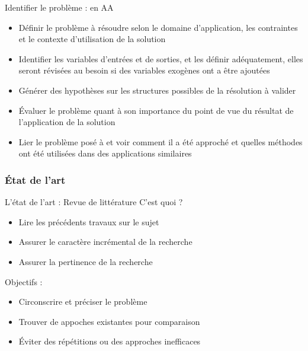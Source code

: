 \documentclass[french]{beamer}
\newcommand\red[1]{{\color{ulred}{\textbf{#1}}}}
\begin{document}
\begin{frame}{Identifier le problème : en AA}
\begin{itemize}
	\item Définir le problème à résoudre selon le domaine d'application, les contraintes et le contexte d'utilisation de la solution
	\item Identifier les variables d'entrées et de sorties, et les définir adéquatement, elles seront révisées au besoin si des variables exogènes ont a être ajoutées
	\item Générer des hypothèses sur les structures possibles de la résolution à valider
	\item Évaluer le problème quant à son importance du point de vue du résultat de l'application de la solution
	\item Lier le problème posé à \red{l’état de l’art} et voir comment il a été approché et quelles méthodes ont été utilisées dans des applications similaires
\end{itemize}
\end{frame}

\subsubsection{État de l'art}
\begin{frame}{L'état de l'art : Revue de littérature}
C'est quoi ? 
\begin{itemize}
	\item Lire les précédents travaux sur le sujet
	\item Assurer le caractère incrémental de la recherche 
	\item Assurer la pertinence de la recherche
\end{itemize}
Objectifs : 
\begin{itemize}
	\item Circonscrire et préciser le problème
	\item Trouver de appoches existantes pour comparaison
	\item Éviter des répétitions ou des approches inefficaces
\end{itemize}
\end{frame}
\end{document}
